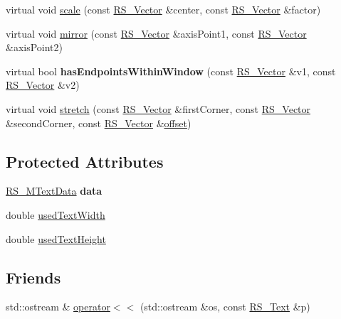 \begin{DoxyCompactItemize}
\item 
virtual void \hyperlink{classRS__MText_addcfc300ac9be2dc7bbe1eedfcccdee5}{scale} (const \hyperlink{classRS__Vector}{R\-S\-\_\-\-Vector} \&center, const \hyperlink{classRS__Vector}{R\-S\-\_\-\-Vector} \&factor)
\item 
virtual void \hyperlink{classRS__MText_a3f952f6d450ced94eafcc8b5acdc3fe0}{mirror} (const \hyperlink{classRS__Vector}{R\-S\-\_\-\-Vector} \&axis\-Point1, const \hyperlink{classRS__Vector}{R\-S\-\_\-\-Vector} \&axis\-Point2)
\item 
\hypertarget{classRS__MText_a0d1db9b2b805c9a81ffcddac4aa69a0b}{virtual bool {\bfseries has\-Endpoints\-Within\-Window} (const \hyperlink{classRS__Vector}{R\-S\-\_\-\-Vector} \&v1, const \hyperlink{classRS__Vector}{R\-S\-\_\-\-Vector} \&v2)}\label{classRS__MText_a0d1db9b2b805c9a81ffcddac4aa69a0b}

\item 
virtual void \hyperlink{classRS__MText_a9f2ee6ecf43143f49bd341db28a83bf6}{stretch} (const \hyperlink{classRS__Vector}{R\-S\-\_\-\-Vector} \&first\-Corner, const \hyperlink{classRS__Vector}{R\-S\-\_\-\-Vector} \&second\-Corner, const \hyperlink{classRS__Vector}{R\-S\-\_\-\-Vector} \&\hyperlink{classRS__Entity_aa296d21b9aac99161d386ce2f60f0fea}{offset})
\end{DoxyCompactItemize}
\subsection*{Protected Attributes}
\begin{DoxyCompactItemize}
\item 
\hypertarget{classRS__MText_adab55cabd77d10ecfcd08a828d2fe3de}{\hyperlink{classRS__MTextData}{R\-S\-\_\-\-M\-Text\-Data} {\bfseries data}}\label{classRS__MText_adab55cabd77d10ecfcd08a828d2fe3de}

\item 
double \hyperlink{classRS__MText_a8083580be2a66e5b2009fcfbd2b9519e}{used\-Text\-Width}
\item 
double \hyperlink{classRS__MText_af928fb0bc4d1ee31e887c5366a5a2338}{used\-Text\-Height}
\end{DoxyCompactItemize}
\subsection*{Friends}
\begin{DoxyCompactItemize}
\item 
std\-::ostream \& \hyperlink{classRS__MText_a7820eae61e0f55687a8dc7b6e19afb32}{operator$<$$<$} (std\-::ostream \&os, const \hyperlink{classRS__Text}{R\-S\-\_\-\-Text} \&p)
\end{DoxyCompactItemize}
